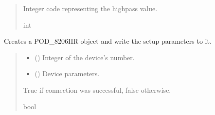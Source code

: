 \documentclass[letterpaper,10pt,english]{sphinxmanual}
\begin{document}
\begin{fulllineitems}
\begin{fulllineitems}
\begin{quote}
\begin{description}
\sphinxAtStartPar
Integer code representing the highpass value.

\sphinxAtStartPar
int

\end{description}\end{quote}

\end{fulllineitems}


\begin{fulllineitems}
\label{\detokenize{Setup_8401HR:Setup_8401HR.Setup_8401HR._ConnectPODdevice}}
\pysigstartsignatures
{}
\pysigstopsignatures
\sphinxAtStartPar
Creates a POD\_8206HR object and write the setup parameters to it.
\begin{quote}\begin{description}
\begin{itemize}
\item {} 
\sphinxAtStartPar
{} () \textendash{} Integer of the device’s number.

\item {} 
\sphinxAtStartPar
{} ({\hyperref[\detokenize{Setup_PodParameters:Setup_PodParameters.Params_8401HR}]{}}) \textendash{} Device parameters.

\end{itemize}

\sphinxAtStartPar
True if connection was successful, false otherwise.

\sphinxAtStartPar
bool

\end{description}\end{quote}


\end{fulllineitems}
\end{fulllineitems}
\end{document}
